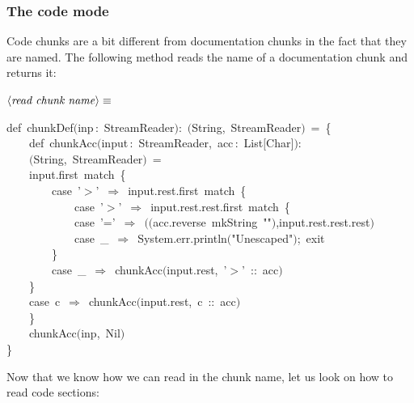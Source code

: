 \documentclass[a4paper,12pt]{article}
\begin{document}
\subsubsection{The code mode}
Code chunks are a bit different from documentation chunks in the fact that
they are named. The following method reads the name of a documentation chunk
and returns it:

$\left<\mbox{\emph{read chunk name}}\right>\equiv$
\begin{program}{\vem def}~chunkDef$($inp\,{\rm :}~StreamReader$)${\rm :}~$($String,~StreamReader$)$~=~{\small\{}
\\~~~~{\vem def}~chunkAcc$($input\,{\rm :}~StreamReader,~acc\,{\rm :}~List$[$Char$]$$)${\rm :}
\\~~~~$($String,~StreamReader$)$~=
\\~~~~input.first~{\vem match}~{\small\{}
\\~~~~~~~~{\vem case}~'$>$'~$\Rightarrow$~input.rest.first~{\vem match}~{\small\{}
\\~~~~~~~~~~~~{\vem case}~'$>$'~$\Rightarrow$~input.rest.rest.first~{\vem match}~{\small\{}
\\~~~~~~~~~~~~{\vem case}~'='~$\Rightarrow$~$($$($acc.reverse~mkString~""$)$,input.rest.rest.rest$)$
\\~~~~~~~~~~~~{\vem case}~\_~$\Rightarrow$~System.err.println$($"Unescaped"$)$;~exit
\\~~~~~~~~{\small\}}
\\~~~~~~~~{\vem case}~\_~$\Rightarrow$~chunkAcc$($input.rest,~'$>$'~{\rm :}{\rm :}~acc$)$
\\~~~~{\small\}}
\\~~~~{\vem case}~c~$\Rightarrow$~chunkAcc$($input.rest,~c~{\rm :}{\rm :}~acc$)$
\\~~~~{\small\}}
\\[0.5em]~~~~chunkAcc$($inp,~Nil$)$
\\{\small\}}
\\[0.5em]\end{program}
Now that we know how we can read in the chunk name, let us look on how to
read code sections:
\end{document}
